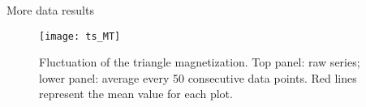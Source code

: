 \begin{frame}{More data results}
\begin{figure}[h]
    \centering
    \texttt{[image: ts\_MT]}
    \caption{Fluctuation of the triangle magnetization. Top panel: raw series; lower panel: average every 50 consecutive data points. Red lines represent the mean value for each plot.}
    \label{fig:ts2}
\end{figure}
\end{frame}
%
%




